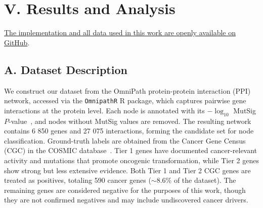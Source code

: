\documentclass[
  reprint,
  superscriptaddress,
  amsmath,amssymb,
  aps,prl,
]{revtex4-2}
\begin{document}
\section{V. Results and Analysis}
%
%
%
\noindent \href{https://github.com/apatriciamarques/Network-Based-Prediction}{The implementation and all data used in this work are openly available on GitHub}.



\subsection{A. Dataset Description}
%
%
%
\noindent  We construct our dataset from the OmniPath protein-protein interaction (PPI) network, accessed via the \texttt{OmnipathR} R package, which captures pairwise gene interactions at the protein level. 
Each node is annotated with its \(-\log_{10}\) MutSig \(P\)-value~\cite{lawrence2014discovery}, and nodes without MutSig values are removed. 
The resulting network contains 6 850 genes and 27 075 interactions, forming the candidate set for node classification. 
Ground-truth labels are obtained from the Cancer Gene Census (CGC) in the COSMIC database~\cite{10.1093/nar/gky1015}. Tier 1 genes have documented cancer-relevant activity and mutations that promote oncogenic transformation, while Tier 2 genes show strong but less extensive evidence.
Both Tier 1 and Tier 2 CGC genes are treated as positives, totaling 590 cancer genes (\(\sim 8.6\%\) of the dataset). 
The remaining genes are considered negative for the purposes of this work, though they are not confirmed negatives and may include undiscovered cancer drivers. 
%
\end{document}
